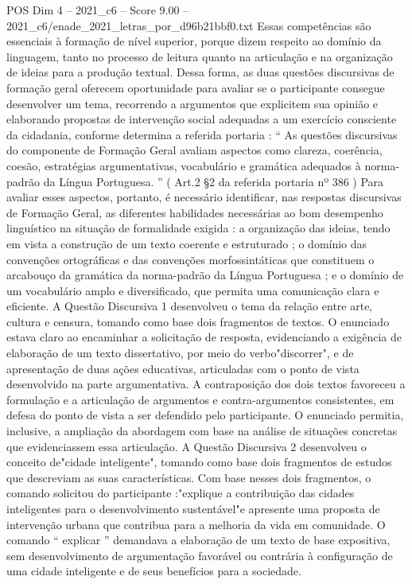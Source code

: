 \begin{textsample}{POS Dim 4 – 2021\_c6 – Score 9.00 – 2021\_c6/enade\_2021\_letras\_por\_d96b21bbf0.txt}
Essas competências são essenciais à formação de nível superior, porque dizem respeito ao domínio da linguagem, tanto no processo de leitura quanto na articulação e na organização de ideias para a produção textual.
Dessa forma, as duas questões discursivas de formação geral oferecem oportunidade para avaliar se o participante consegue desenvolver um tema, recorrendo a argumentos que explicitem sua opinião e elaborando propostas de intervenção social adequadas a um exercício consciente da cidadania, conforme determina a referida portaria : “ As questões discursivas do componente de Formação Geral avaliam aspectos como clareza, coerência, coesão, estratégias argumentativas, vocabulário e gramática adequados à norma-padrão da Língua Portuguesa. ” ( Art.2 §2 da referida portaria nº 386 ) Para avaliar esses aspectos, portanto, é necessário identificar, nas respostas discursivas de Formação Geral, as diferentes habilidades necessárias ao bom desempenho linguístico na situação de formalidade exigida : a organização das ideias, tendo em vista a construção de um texto coerente e estruturado ; o domínio das convenções ortográficas e das convenções morfossintáticas que constituem o arcabouço da gramática da norma-padrão da Língua Portuguesa ; e o domínio de um vocabulário amplo e diversificado, que permita uma comunicação clara e eficiente.
A Questão Discursiva 1 desenvolveu o tema da relação entre arte, cultura e censura, tomando como base dois fragmentos de textos.
O enunciado estava claro ao encaminhar a solicitação de resposta, evidenciando a exigência de elaboração de um texto dissertativo, por meio do verbo"discorrer", e de apresentação de duas ações educativas, articuladas com o ponto de vista desenvolvido na parte argumentativa.
A contraposição dos dois textos favoreceu a formulação e a articulação de argumentos e contra-argumentos consistentes, em defesa do ponto de vista a ser defendido pelo participante.
O enunciado permitia, inclusive, a ampliação da abordagem com base na análise de situações concretas que evidenciassem essa articulação.
A Questão Discursiva 2 desenvolveu o conceito de"cidade inteligente", tomando como base dois fragmentos de estudos que descreviam as suas características.
Com base nesses dois fragmentos, o comando solicitou do participante :"explique a contribuição das cidades inteligentes para o desenvolvimento sustentável"e apresente uma proposta de intervenção urbana que contribua para a melhoria da vida em comunidade.
O comando “ explicar ” demandava a elaboração de um texto de base expositiva, sem desenvolvimento de argumentação favorável ou contrária à configuração de uma cidade inteligente e de seus benefícios para a sociedade.

\end{textsample}
